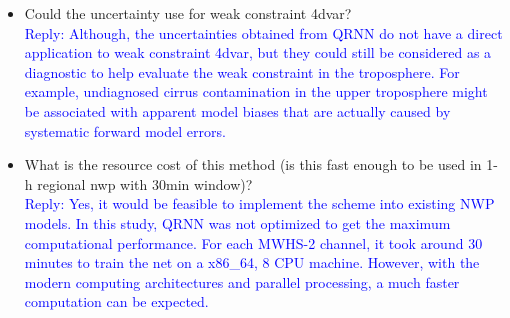 \documentclass[11pt,a4paper,draft]{article}
\begin{document}
\begin{itemize}
\item	Could the uncertainty use for weak constraint 4dvar?\\
		
\textcolor{blue}{Reply: Although, the uncertainties obtained from QRNN do not have a direct application to weak constraint 4dvar, but they could still be considered as a diagnostic to help evaluate the weak constraint in the troposphere. For example, undiagnosed cirrus contamination in the upper troposphere might be associated with apparent model biases that are actually caused by systematic forward model errors. }\\
		
		
		
\item	
		What is the resource cost of this method (is this fast enough to be used in 1-h regional
		nwp with 30min window)?\\
	
\textcolor{blue}{Reply:  Yes, it would be feasible to implement the scheme into existing NWP models. In this study, QRNN was not optimized to get the maximum computational performance. For each MWHS-2 channel, it took around 30 minutes to train the net on a  x86\_64, 8 CPU machine. However, with the modern computing architectures and parallel processing, a much faster computation can be expected. }\\
		
\end{itemize}
		
 
 	
	
\end{document}
